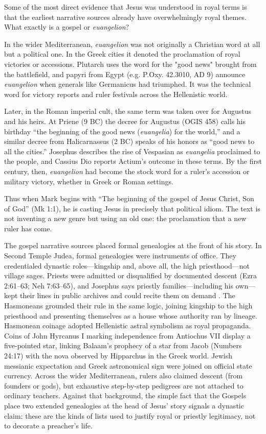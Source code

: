 Some of the most direct evidence that Jesus was understood in royal terms is that the earliest narrative sources already have overwhelmingly royal themes.
What exactly is a gospel or \emph{euangelion}?

In the wider Mediterranean, \emph{euangelion} was not originally a Christian word at all but a political one.
In the Greek cities it denoted the proclamation of royal victories or accessions.
Plutarch \cite[Sertorius 11.4]{plutarch:lives} uses the word for the "good news" brought from the battlefield, and papyri from Egypt (e.g. P.Oxy. 42.3010, AD 9) announce \emph{euangelion} when generals like Germanicus had triumphed.
It was the technical word for victory reports and ruler festivals across the Hellenistic world.

Later, in the Roman imperial cult, the same term was taken over for Augustus and his heirs.
At Priene (9 BC) the decree for Augustus (OGIS 458) calls his birthday “the beginning of the good news (\emph{euangelia}) for the world,” and a similar decree from Halicarnassus (2 BC) speaks of his honors as “good news to all the cities.”
Josephus \cite[4.618]{josephus:war} describes the rise of Vespasian as \emph{euangelia} proclaimed to the people, and Cassius Dio \cite[51.19.6]{cassiusdio:romanhistory} reports Actium's outcome in these terms.
By the first century, then, \emph{euangelion} had become the stock word for a ruler’s accession or military victory, whether in Greek or Roman settings.

Thus when Mark begins with “The beginning of the gospel of Jesus Christ, Son of God” (Mk 1:1), he is casting Jesus in precisely that political idiom.
The text is not inventing a new genre but using an old one: the proclamation that a new ruler has come.

The gospel narrative sources placed formal genealogies at the front of his story.
In Second Temple Judea, formal genealogies were instruments of office.
They credentialed dynastic roles---kingship and, above all, the high priesthood---not village sages.
Priests were admitted or disqualified by documented descent (Ezra 2:61--63; Neh 7:63--65), and Josephus says priestly families---including his own---kept their lines in public archives and could recite them on demand \cite[1.30--36]{josephus:apion}.
The Hasmoneans grounded their rule in the same logic, joining kingship to the high priesthood and presenting themselves as a house whose authority ran by lineage.
Hasmonean coinage adopted Hellenistic astral symbolism as royal propaganda.
Coins of John Hyrcanus I marking independence from Antiochus VII display a five-pointed star, linking Balaam's prophecy of a star from Jacob (Numbers 24:17) with the nova observed by Hipparchus in the Greek world.
Jewish messianic expectation and Greek astronomical sign were joined on official state currency.
Across the wider Mediterranean, rulers also claimed descent (from founders or gods), but exhaustive step-by-step pedigrees are not attached to ordinary teachers.
Against that background, the simple fact that the Gospels place two extended genealogies at the head of Jesus’ story signals a dynastic claim: these are the kinds of lists used to justify royal or priestly legitimacy, not to decorate a preacher’s life.

